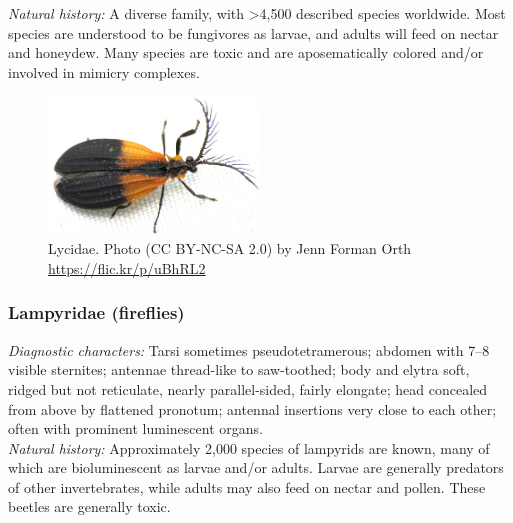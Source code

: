 \documentclass[letterpaper, 11pt]{article}
\begin{document}
\noindent{}\textit{Natural history:} A diverse family, with \textgreater4,500 described species worldwide. Most species are understood to be fungivores as larvae, and adults will feed on nectar and honeydew. Many species are toxic and are aposematically colored and/or involved in mimicry complexes.

\begin{figure}[ht!]
  \centering
    \includegraphics[width=0.5\textwidth]{LycidHabitus}
  \caption{Lycidae. Photo (CC BY-NC-SA 2.0) by Jenn Forman Orth \url{https://flic.kr/p/uBhRL2}}
  \label{fig:lycid}
\end{figure}

\subsubsection{Lampyridae (fireflies)}
\noindent{}\textit{Diagnostic characters:} Tarsi sometimes pseudotetramerous; abdomen with 7--8 visible sternites; antennae thread-like to saw-toothed; body and elytra soft, ridged but not reticulate, nearly parallel-sided, fairly elongate; head concealed from above by flattened pronotum; antennal insertions very close to each other; often with prominent luminescent organs.\\

\noindent{}\textit{Natural history:} Approximately 2,000 species of lampyrids are known, many of which are bioluminescent as larvae and/or adults. Larvae are generally predators of other invertebrates, while adults may also feed on nectar and pollen. These beetles are generally toxic.
\end{document}

